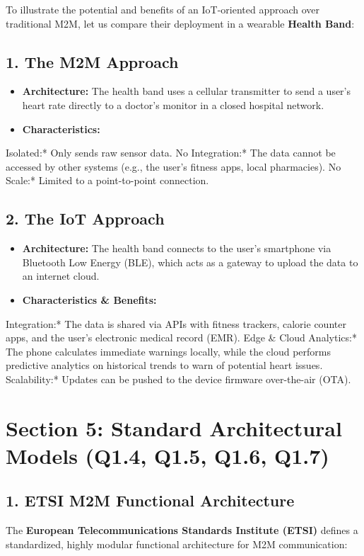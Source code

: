 To illustrate the potential and benefits of an IoT-oriented approach over traditional M2M, let us compare their deployment in a wearable \textbf{Health Band}:

\subsection{1. The M2M Approach}
\begin{itemize}
  \item   \textbf{Architecture:} The health band uses a cellular transmitter to send a user's heart rate directly to a doctor's monitor in a closed hospital network.
  \item   \textbf{Characteristics:}
\end{itemize}
    \textit{   }Isolated:* Only sends raw sensor data.
    \textit{   }No Integration:* The data cannot be accessed by other systems (e.g., the user's fitness apps, local pharmacies).
    \textit{   }No Scale:* Limited to a point-to-point connection.

\subsection{2. The IoT Approach}
\begin{itemize}
  \item   \textbf{Architecture:} The health band connects to the user's smartphone via Bluetooth Low Energy (BLE), which acts as a gateway to upload the data to an internet cloud.
  \item   \textbf{Characteristics \& Benefits:}
\end{itemize}
    \textit{   }Integration:* The data is shared via APIs with fitness trackers, calorie counter apps, and the user's electronic medical record (EMR).
    \textit{   }Edge \& Cloud Analytics:* The phone calculates immediate warnings locally, while the cloud performs predictive analytics on historical trends to warn of potential heart issues.
    \textit{   }Scalability:* Updates can be pushed to the device firmware over-the-air (OTA).


\section{Section 5: Standard Architectural Models (Q1.4, Q1.5, Q1.6, Q1.7)}

\subsection{1. ETSI M2M Functional Architecture}
The \textbf{European Telecommunications Standards Institute (ETSI)} defines a standardized, highly modular functional architecture for M2M communication:

